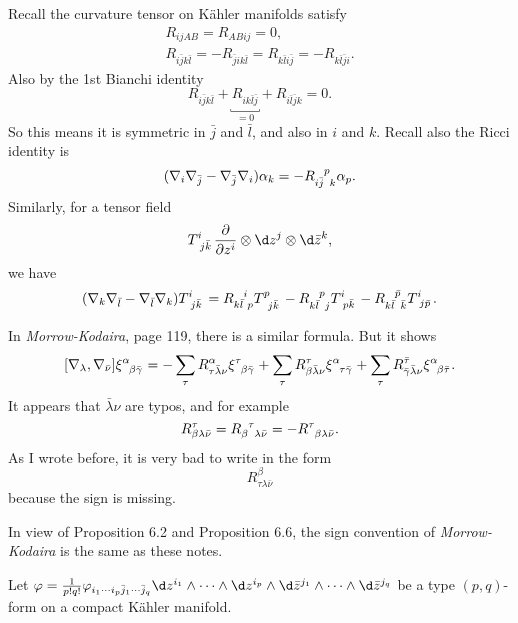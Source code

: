 \documentclass[12pt]{article}
\begin{document}
Recall the curvature tensor on Kähler manifolds satisfy
\begin{gather*}
  R_{ijAB}=R_{ABij}=0, \\
  R_{i\bar{j}k\bar{l}}=-R_{\bar{j}ik\bar{l}}=R_{k\bar{l}i\bar{j}}
  =-R_{k\bar{l}\bar{j}i}
.\end{gather*} 
Also by the 1st Bianchi identity \[
  R_{i\bar{j}k\bar{l}}+\underbracket{R_{ik\bar{l}\bar{j}}}_{=0}
  +R_{i\bar{l}\bar{j}k}=0
.\] So this means it is symmetric in \(\bar{j}\) and \(\bar{l}\), and also in
\(i\) and \(k\). Recall also the Ricci identity is \[
  (\nabla_i \nabla_{\bar{j}}-\nabla_{\bar{j}}\nabla_i)\alpha_k 
  =-R\indices{_{i\bar{j}}^p_k}\alpha_p
.\] Similarly, for a tensor field \[
  T\indices{^i_{j\bar{k}}}\pd{z^i}\otimes \dd{z^j}\otimes \dd{\bar{z}^k}
,\] we have \[
  (\nabla_k\nabla_{\bar{l}}-\nabla_{\bar{l}}\nabla_k)T\indices{^i_{j\bar{k}}}
  =R\indices{_{k\bar{l}}^i_p}T\indices{^p_{j\bar{k}}}-R\indices{_{k\bar{l}}^p_j}
  T\indices{^i_{p\bar{k}}}-R\indices{_{k\bar{l}}^{\bar{p}}_{\bar{k}}}
  T\indices{^i_{j\bar{p}}}
.\] 
\begin{remark}
  In \emph{Morrow-Kodaira}, page 119, there is a similar formula. But it shows \[
    [\nabla_\lambda,\nabla_{\bar{\nu}}]\xi\indices{^\alpha_{\beta\bar{\gamma}}}
    =-\sum_{\tau}R_{\tau\bar{\lambda}\nu}^\alpha
    \xi\indices{^\tau_{\beta\bar{\gamma}}}
    +\sum_{\tau}R_{\beta\bar{\lambda}\nu}^\tau
    \xi\indices{^\alpha_{\tau\bar{\gamma}}}
    +\sum_{\tau}R_{\bar{\gamma}\bar{\lambda}\nu}^{\bar{\tau}}
    \xi\indices{^\alpha_{\beta\bar{\tau}}}
  .\] It appears that \(\bar{\lambda}\nu\) are typos, and for example \[
    R_{\beta\lambda\bar{\nu}}^\tau=R\indices{_\beta^\tau_{\lambda\bar{\nu}}}
    =-R\indices{^\tau_{\beta\lambda\bar{\nu}}}
  .\] As I wrote before, it is very bad to write in the form \[
    R_{\tau\lambda\bar{\nu}}^{\beta}
  \] because the sign is missing.

  In view of  Proposition 6.2 and Proposition 6.6, the sign convention of
  \emph{Morrow-Kodaira} is the same as these notes.
\end{remark}
Let \(\vphi=\frac{1}{p!q!}\vphi_{i_1\cdots i_p\bar{j}_1\cdots \bar{j}_q}
\dd{z}^{i_1}\wedge\cdots\wedge\dd{z^{i_p}}\wedge\dd{\bar{z}^{j_1}}\wedge\cdots
\wedge\dd{\bar{z}^{j_q}}\) be a type \((p,q)\)-form on a compact Kähler manifold.
\end{document}
